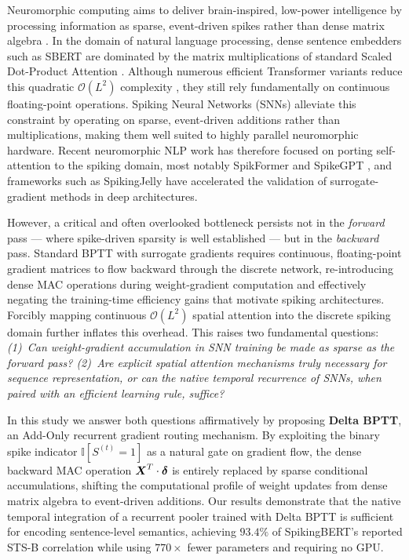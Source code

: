 \documentclass[runningheads]{llncs}
\begin{document}
Neuromorphic computing aims to deliver brain-inspired, low-power intelligence by processing information as sparse, event-driven spikes rather than dense matrix algebra \cite{roy2019towards}. In the domain of natural language processing, dense sentence embedders such as SBERT \cite{reimers2019sentence} are dominated by the matrix multiplications of standard Scaled Dot-Product Attention \cite{vaswani2017attention}. Although numerous efficient Transformer variants reduce this quadratic $\mathcal{O}(L^2)$ complexity \cite{tay2022efficient}, they still rely fundamentally on continuous floating-point operations. Spiking Neural Networks (SNNs) alleviate this constraint by operating on sparse, event-driven additions rather than multiplications, making them well suited to highly parallel neuromorphic hardware. Recent neuromorphic NLP work has therefore focused on porting self-attention to the spiking domain, most notably SpikFormer \cite{zhou2023spikformer} and SpikeGPT \cite{zhu2023spikegpt}, and frameworks such as SpikingJelly \cite{fang2023spikingjelly} have accelerated the validation of surrogate-gradient methods in deep architectures.

However, a critical and often overlooked bottleneck persists not in the \textit{forward} pass --- where spike-driven sparsity is well established --- but in the \textit{backward} pass. Standard BPTT with surrogate gradients \cite{neftci2019surrogate} requires continuous, floating-point gradient matrices to flow backward through the discrete network, re-introducing dense MAC operations during weight-gradient computation and effectively negating the training-time efficiency gains that motivate spiking architectures. Forcibly mapping continuous $\mathcal{O}(L^2)$ spatial attention into the discrete spiking domain further inflates this overhead. This raises two fundamental questions: \textit{(1)~Can weight-gradient accumulation in SNN training be made as sparse as the forward pass? (2)~Are explicit spatial attention mechanisms truly necessary for sequence representation, or can the native temporal recurrence of SNNs, when paired with an efficient learning rule, suffice?}

In this study we answer both questions affirmatively by proposing \textbf{Delta BPTT}, an Add-Only recurrent gradient routing mechanism. By exploiting the binary spike indicator $\mathbb{I}[S^{(t)} = 1]$ as a natural gate on gradient flow, the dense backward MAC operation $\boldsymbol{X}^T \cdot \boldsymbol{\delta}$ is entirely replaced by sparse conditional accumulations, shifting the computational profile of weight updates from dense matrix algebra to event-driven additions. Our results demonstrate that the native temporal integration of a recurrent pooler trained with Delta BPTT is sufficient for encoding sentence-level semantics, achieving $93.4\%$ of SpikingBERT's reported STS-B correlation \cite{bal2024spikingbert} while using $770\times$ fewer parameters and requiring no GPU.
\end{document}
